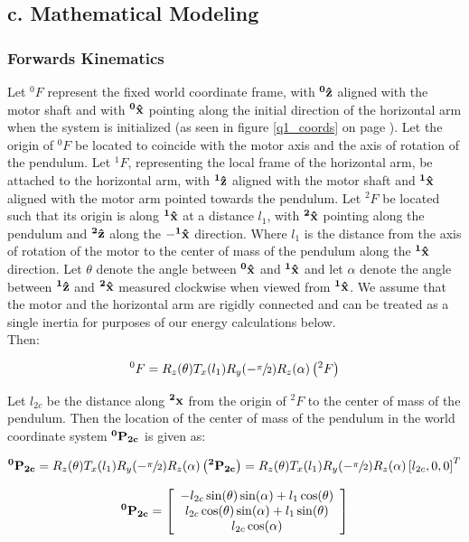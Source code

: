 \documentclass{article}
\theoremstyle{plain}
\theoremstyle{definition}
\theoremstyle{remark}
\begin{document}
\subsection*{c. Mathematical Modeling}
\subsubsection*{Forwards Kinematics}
Let $^0F$ represent the fixed world coordinate frame, with $\bf{^0\hat{z}}$ aligned with the motor shaft and with $\bf{^0\hat{x}}$ pointing along the initial direction of the horizontal arm when the system is initialized (as seen in figure \ref{q1_coords} on page \pageref{q1_coords}).  Let the origin of $^0F$ be located to coincide with the motor axis and the axis of rotation of the pendulum.  Let $^1F$, representing the local frame of the horizontal arm, be attached to the horizontal arm, with $\bf{^1\hat{z}}$ aligned with the motor shaft and $\bf{^1\hat{x}}$ aligned with the motor arm pointed towards the pendulum.  Let $^2F$ be located such that its origin is along $\bf{^1\hat{x}}$ at a distance $l_1$, with $\bf{^2\hat{x}}$ pointing along the pendulum and $\bf{^2\hat{z}}$ along the $\bf{-^1\hat{x}}$ direction.  Where $l_1$ is the distance from the axis of rotation of the motor to the center of mass of the pendulum along the $\bf{^1\hat{x}}$ direction.  Let $\theta$ denote the angle between $\bf{^0\hat{x}}$ and $\bf{^1\hat{x}}$ and let $\alpha$ denote the angle between $\bf{^1\hat{z}}$ and $\bf{^2\hat{x}}$ measured clockwise when viewed from $\bf{^1\hat{x}}$.  We assume that the motor and the horizontal arm are rigidly connected and can be treated as a single inertia for purposes of our energy calculations below.\\

Then:

$$ ^0F = R_{z}(\theta) T_{x}(l_{1}) R_{y}(-\sfrac{\pi}{2}) R_{z}(\alpha) \left(^2F\right) $$

Let $l_{2c}$ be the distance along $\bf{^2x}$ from the origin of $^2F$ to the center of mass of the pendulum.  Then the location of the center of mass of the pendulum in the world coordinate system $\bf{^0P_{2c}}$ is given as:

$$ {\bf{^0P_{2c}}} = R_{z}(\theta) T_{x}(l_{1}) R_{y}(-\sfrac{\pi}{2}) R_{z}(\alpha) \left(\bf{^2P_{2c}}\right) = R_{z}(\theta) T_{x}(l_{1}) R_{y}(-\sfrac{\pi}{2}) R_{z}(\alpha) \left[l_{2c}, 0, 0\right]^T$$

\[
  {\bf{^0P_{2c}}} = \left[
  \begin{array}{c l}
	 -l_{2c} \sin(\theta) \sin(\alpha) + l_{1} \cos(\theta) \\
	l_{2c} \cos(\theta) \sin(\alpha) + l_1 \sin(\theta) \\
	l_{2c} \cos(\alpha) 
  \end{array} \right]
\]
\end{document}

